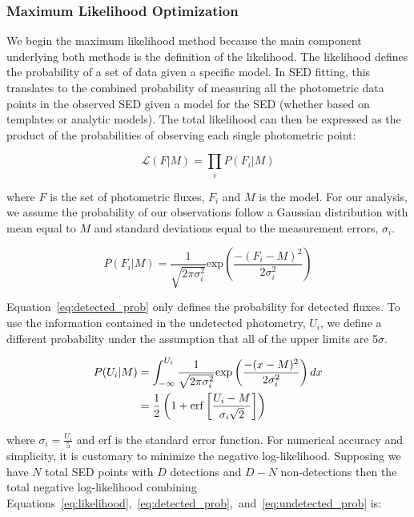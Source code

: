 \documentclass[fleqn, usenatbib]{mnras}
\begin{document}
\subsubsection{Maximum Likelihood Optimization}
We begin the maximum likelihood method because the main component underlying both methods is the definition of the likelihood. The likelihood defines the probability of a set of data given a specific model. In SED fitting, this translates to the combined probability of measuring all the photometric data points in the observed SED given a model for the SED (whether based on templates or analytic models). The total likelihood can then be expressed as the product of the probabilities of observing each single photometric point:

\begin{equation}\label{eq:likelihood}
\mathcal{L}(F|M) = \prod_{i}P(F_i|M)
\end{equation}

\noindent where $F$ is the set of photometric fluxes, $F_i$ and $M$ is the model. For our analysis, we assume the probability of our observations follow a Gaussian distribution with mean equal to $M$ and standard deviations equal to the measurement errors, $\sigma_{i}$.

\begin{equation}\label{eq:detected_prob}
P(F_i|M) = \frac{1}{\sqrt{2\pi\sigma_{i}^{2}}}\mathrm{exp}\left(\frac{-(F_i - M)^2}{2\sigma_i^2}\right)
\end{equation}

Equation~\ref{eq:detected_prob} only defines the probability for detected fluxes. To use the information contained in the undetected photometry, $U_i$, we define a different probability under the assumption that all of the upper limits are 5$\sigma$. 

\begin{align}\label{eq:undetected_prob}
P(U_i|M) &= \int_{-\infty}^{U_i}\frac{1}{\sqrt{2\pi\sigma_{i}^{2}}}\mathrm{exp}\left(\frac{-(x - M)^2}{2\sigma_i^2}\right)dx \notag\\
&= \frac{1}{2}\left(1 + \mathrm{erf}\left[\frac{U_i - M}{\sigma_i\sqrt{2}}\right]\right) 
\end{align}

\noindent where $\sigma_i = \frac{U_i}{5}$ and erf is the standard error function. For numerical accuracy and simplicity, it is customary to minimize the negative log-likelihood. Supposing we have $N$ total SED points with $D$ detections and $D-N$ non-detections then the total negative log-likelihood combining Equations~\ref{eq:likelihood},~\ref{eq:detected_prob},~and~\ref{eq:undetected_prob} is:
\end{document}
